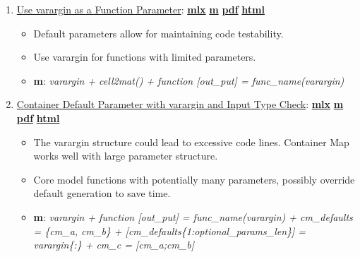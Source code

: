 \documentclass[
]{book}
\providecommand{\tightlist}{%
  \setlength{\itemsep}{0pt}\setlength{\parskip}{0pt}}
\begin{document}
\begin{enumerate}
\def\labelenumi{\arabic{enumi}.}
\tightlist
\item
  \href{https://fanwangecon.github.io/M4Econ/function/defaultparam/htmlpdfm/fs_varargin.html}{Use varargin as a Function Parameter}: \href{https://github.com/FanWangEcon/M4Econ/blob/master/function/defaultparam/fs_varargin.mlx}{\textbf{mlx}} \textbar{} \href{https://github.com/FanWangEcon/M4Econ/blob/master/function/defaultparam/htmlpdfm/fs_varargin.m}{\textbf{m}} \textbar{} \href{https://github.com/FanWangEcon/M4Econ/blob/master/function/defaultparam/htmlpdfm/fs_varargin.pdf}{\textbf{pdf}} \textbar{} \href{https://fanwangecon.github.io/M4Econ/function/defaultparam/htmlpdfm/fs_varargin.html}{\textbf{html}}

  \begin{itemize}
  \tightlist
  \item
    Default parameters allow for maintaining code testability.
  \item
    Use varargin for functions with limited parameters.
  \item
    \textbf{m}: \emph{varargin + cell2mat() + function {[}out\_put{]} = func\_name(varargin)}
  \end{itemize}
\item
  \href{https://fanwangecon.github.io/M4Econ/function/defaultparam/htmlpdfm/fs_defaultmap.html}{Container Default Parameter with varargin and Input Type Check}: \href{https://github.com/FanWangEcon/M4Econ/blob/master/function/defaultparam/fs_defaultmap.mlx}{\textbf{mlx}} \textbar{} \href{https://github.com/FanWangEcon/M4Econ/blob/master/function/defaultparam/htmlpdfm/fs_defaultmap.m}{\textbf{m}} \textbar{} \href{https://github.com/FanWangEcon/M4Econ/blob/master/function/defaultparam/htmlpdfm/fs_defaultmap.pdf}{\textbf{pdf}} \textbar{} \href{https://fanwangecon.github.io/M4Econ/function/defaultparam/htmlpdfm/fs_defaultmap.html}{\textbf{html}}

  \begin{itemize}
  \tightlist
  \item
    The varargin structure could lead to excessive code lines. Container Map works well with large parameter structure.
  \item
    Core model functions with potentially many parameters, possibly override default generation to save time.
  \item
    \textbf{m}: \emph{varargin + function {[}out\_put{]} = func\_name(varargin) + cm\_defaults = \{cm\_a, cm\_b\} + {[}cm\_defaults\{1:optional\_params\_len\}{]} = varargin\{:\} + cm\_c = {[}cm\_a;cm\_b{]}}
  \end{itemize}
\end{enumerate}
\end{document}
